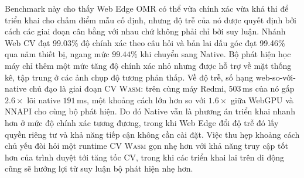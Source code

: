 \documentclass[conference]{IEEEtran}
\newcommand{\wasm}{\textnormal{\textsc{Wasm}}}
\begin{document}
Benchmark này cho thấy Web Edge OMR có thể vừa chính xác vừa khả thi để triển khai
cho chấm điểm mẫu cố định, nhưng độ trễ của nó được quyết định bởi cách các giai
đoạn cân bằng với nhau chứ không phải chỉ bởi suy luận. Nhánh Web CV đạt 99.03\%
độ chính xác theo câu hỏi và bản lai dấu góc đạt 99.46\% qua năm thiết bị, ngang
mức $99.44\%$ khi chuyển sang Native. Bộ phát hiện học máy chỉ thêm một mức tăng
độ chính xác nhỏ nhưng được hỗ trợ về mặt thống kê, tập trung ở các ảnh chụp độ
tương phản thấp. Về độ trễ, số hạng web-so-với-native chủ đạo là giai đoạn CV
\wasm{}: trên cùng máy Redmi, $503$\,ms của nó gấp $2.6\times$ lõi native $191$\,ms,
một khoảng cách lớn hơn so với $1.6\times$ giữa WebGPU và NNAPI cho cùng bộ phát
hiện. Do đó Native vẫn là phương án triển khai nhanh hơn ở mức độ chính xác tương
đương, trong khi Web Edge đổi độ trễ đó lấy quyền riêng tư và khả năng tiếp cận
không cần cài đặt. Việc thu hẹp khoảng cách chủ yếu đòi hỏi một runtime CV \wasm{}
gọn nhẹ hơn với khả năng truy cập tốt hơn của trình duyệt tới tăng tốc CV, trong
khi các triển khai lai trên di động cũng sẽ hưởng lợi từ suy luận bộ phát hiện nhẹ
hơn.
\end{document}
